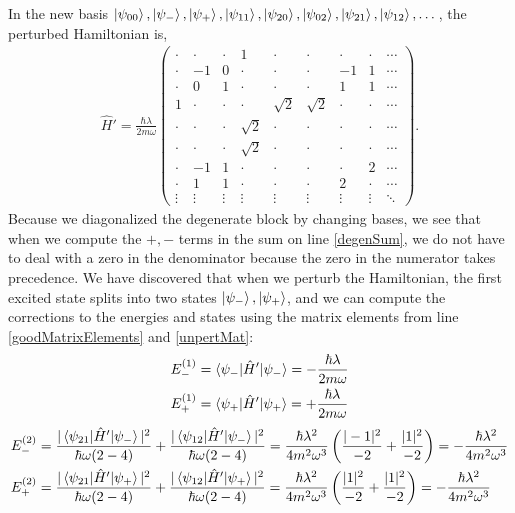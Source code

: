 \documentclass[10pt]{article}
\newcommand{\1}{\mathbf 1}
\begin{document}
In the new basis $\ket{\psi_{00}}, \ket{\psi_{-}},\ket{\psi_{+}},\ket{\psi_{11}},\ket{\psi_{20}},\ket{\psi_{02}},\ket{\psi_{21}},\ket{\psi_{12}},\dots$, the perturbed Hamiltonian is,
\begin{align}
	\hat H'
	=
	\frac{\hbar \lambda}{2 m \omega}
	\left(
		\begin{array}{ccccccccc}
		 \cdot & \cdot & \cdot & 1 & \cdot & \cdot & \cdot & \cdot & \cdots \\
		 \cdot & -1 & 0 & \cdot & \cdot & \cdot & -1 & 1 & \cdots \\
		 \cdot & 0 & 1 & \cdot & \cdot & \cdot & 1 & 1 & \cdots \\
		 1 & \cdot & \cdot & \cdot & \sqrt{2} & \sqrt{2} & \cdot & \cdot & \cdots \\
		 \cdot & \cdot & \cdot & \sqrt{2} & \cdot & \cdot & \cdot & \cdot & \cdots \\
		 \cdot & \cdot & \cdot & \sqrt{2} & \cdot & \cdot & \cdot & \cdot & \cdots \\
		 \cdot & -1 & 1 & \cdot & \cdot & \cdot & \cdot & 2 & \cdots \\
		 \cdot & 1 & 1 & \cdot & \cdot & \cdot & 2 & \cdot & \cdots \\
		 \vdots & \vdots & \vdots & \vdots & \vdots & \vdots & \vdots & \vdots & \ddots
		\end{array}
		\right).\label{goodMatrixElements}
\end{align}
Because we diagonalized the degenerate block by changing bases, we see that when we compute the $+, -$ terms in the sum on line \ref{degenSum}, we do not have to deal with a zero in the denominator because the zero in the numerator takes precedence.
We have discovered that when we perturb the Hamiltonian, the first excited state splits into two states $\ket{\psi_-}, \ket{\psi_+}$, and we can compute the corrections to the energies and states using the matrix elements from line \ref{goodMatrixElements} and \ref{unpertMat}:
\begin{align}
	E^{(1)}_{-}
	&=
	\braket{\psi_- |\hat H' | \psi_-}
	=
	-\frac{\hbar \lambda}{2 m \omega}
	\\
	E^{(1)}_{+}
	&=
	\braket{\psi_+ |\hat H' | \psi_+}
	=
	+\frac{\hbar \lambda}{2 m \omega}
\end{align}
\begin{align}
	E^{(2)}_{-}
	&=
	\frac{|\braket{\psi_{21} |\hat H' | \psi_{-} }|^2}{\hbar \omega(2-4)}
	+
	\frac{|\braket{\psi_{12} |\hat H' | \psi_{-} }|^2}{\hbar \omega(2-4)}
	=
	\frac{\hbar \lambda^2}{4 m^2 \omega^3}
	\left(
		\frac{|-1|^2}{-2}
		+
		\frac{|1|^2}{-2}
	\right)
	=
	-
	\frac{\hbar \lambda^2}{4 m^2 \omega^3}
	\\
	E^{(2)}_{+}
	&=
	\frac{|\braket{\psi_{21} |\hat H' | \psi_{+} }|^2}{\hbar \omega(2-4)}
	+
	\frac{|\braket{\psi_{12} |\hat H' | \psi_{+} }|^2}{\hbar \omega(2-4)}
	=
	\frac{\hbar \lambda^2}{4 m^2 \omega^3}
	\left(
		\frac{|1|^2}{-2}
		+
		\frac{|1|^2}{-2}
	\right)
	=
	-
	\frac{\hbar \lambda^2}{4 m^2 \omega^3}
\end{align}
\end{document}
